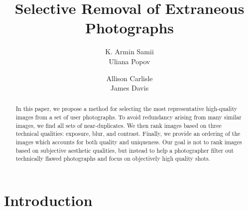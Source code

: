 \documentclass{sig-alternate}
\begin{document}

\title{
Selective Removal of Extraneous Photographs
}

\author{
\alignauthor
K. Armin Samii\\
\alignauthor
Uliana Popov\\
\and 
\alignauthor
Allison Carlisle\\
\alignauthor
James Davis\\
}

\maketitle	
\begin{abstract}
In this paper, we propose a method for selecting the most representative high-quality images from a set of user photographs. To avoid redundancy arising from many similar images, we find all sets of near-duplicates. We then rank images based on three technical qualities: exposure, blur, and contrast. Finally, we provide an ordering of the images which accounts for both quality and uniqueness. Our goal is not to rank images based on subjective aesthetic qualities, but instead to help a photographer filter out technically flawed photographs and focus on objectively high quality shots.
\end{abstract}




\section{Introduction}


\label{sec:intro}
\end{document}
